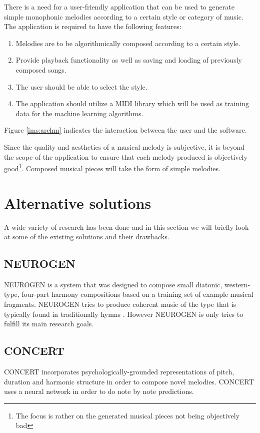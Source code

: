 There is a need for a user-friendly application that can be used to generate simple monophonic melodies according to a certain style or category of music.
The application is required to have the following features:
\begin{enumerate}
\item Melodies are to be algorithmically composed according to a certain style.
\item Provide playback functionality as well as saving and loading of previously composed songs.
\item The user should be able to select the style.
\item The application should utilize a \acs{MIDI} library which will be used as training data for the machine learning algorithms.
\end{enumerate}

Figure \ref{ims:archm} indicates the interaction between the user and the software.

Since the quality and aesthetics of a musical melody is subjective, it is beyond the scope of the application to ensure that each melody produced is objectively good\footnote{The focus is rather on the generated musical pieces not being objectively bad}. Composed musical pieces will take the form of simple melodies.

\section{Alternative solutions}
A wide variety of research has been done and in this section we will briefly look at some of the existing solutions and their drawbacks.

\subsection{NEUROGEN}
NEUROGEN is a system that was designed to compose small diatonic, western-type, four-part harmony compositions based on a training set of example musical fragments. NEUROGEN tries to produce coherent music of the type that is typically found in traditionally hymns \cite{gibson1991neurogen}.
However NEUROGEN is only tries to fulfill its main research goals.

\subsection{CONCERT}
CONCERT incorporates psychologically-grounded representations of pitch, duration and harmonic structure in order to compose novel melodies. CONCERT uses a neural network in order to do note by note predictions. 

